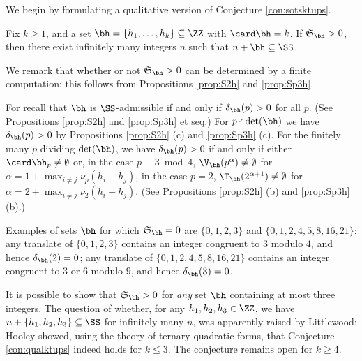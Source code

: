 \documentclass[12pt, reqno, twoside, letterpaper]{amsart}
\begin{document}
We begin by formulating a qualitative version of 
Conjecture \ref{con:sotsktups}.
%
\begin{conjecture} 
 \label{con:qualktups}
Fix $k \ge 1$, and a set 
$\bh = \{h_1,\ldots,h_k\} \subseteq \ZZ$ with $\card \bh = k$. 
%
If $\mathfrak{S}_{\bh} > 0$, then there exist infinitely many 
integers $n$ such that $n + \bh \subseteq \SS$.
\end{conjecture}
%
\noindent
% 
We  remark that whether or not $\mathfrak{S}_{\bh} > 0$ can be 
determined by a finite computation: this follows from 
Propositions \ref{prop:S2h} and \ref{prop:Sp3h}. 
%
%
\begin{nixnix}
%
For recall that $\bh$ is $\SS$-admissible if and only if 
$\delta_{\bh}(p) > 0$ for all $p$.
%
(See Propositions \ref{prop:S2h} and \ref{prop:Sp3h} et seq.)
%
For $p \nmid \det(\bh)$ we have $\delta_{\bh}(p) > 0$ by 
Propositions \ref{prop:S2h} (c) and \ref{prop:Sp3h} (c).
%
For the finitely many $p$ dividing $\det(\bh)$, we have 
$\delta_{\bh}(p) > 0$ if and only if either 
$\card \bh_p \ne \emptyset$ or, in the case $p \equiv 3 \bmod 4$, 
$\V_{\bh}(p^{\alpha}) \ne \emptyset$ for 
$\alpha = 1 + \max_{i \ne j} \nu_p(h_i - h_j)$, in the case 
$p = 2$, $\T_{\bh}(2^{\alpha + 1}) \ne \emptyset$ for 
$\alpha = 2 + \max_{i \ne j} \nu_2(h_i - h_j)$.
%
(See Propositions \ref{prop:S2h} (b) and \ref{prop:Sp3h} (b).)
%
\end{nixnix}
%
%
%
Examples of sets $\bh$ for which $\mathfrak{S}_{\bh} = 0$ are
$\{0,1,2,3\}$ and $\{0,1,2,4,5,8,16,21\}$: any translate of 
$\{0,1,2,3\}$ contains an integer congruent to $3$ modulo $4$, and 
hence $\delta_{\bh}(2) = 0$; any translate of 
$\{0,1,2,4,5,8,16,21\}$ contains an integer congruent to $3$ or 
$6$ modulo $9$, and hence $\delta_{\bh}(3) = 0$.

It is possible to show that $\mathfrak{S}_{\bh} > 0$ for {\em any} 
set $\bh$ containing at most three integers.
%
The question of whether, for any $h_1,h_2,h_3 \in \ZZ$, we have 
$n + \{h_1,h_2,h_3\} \subseteq \SS$ for infinitely many $n$, was 
apparently raised by Littlewood: Hooley \cite{HOO:73} showed, 
using the theory of ternary quadratic forms, that 
Conjecture \ref{con:qualktups} indeed holds for $k \le 3$.
%
The conjecture remains open for $k \ge 4$.
\end{document}
